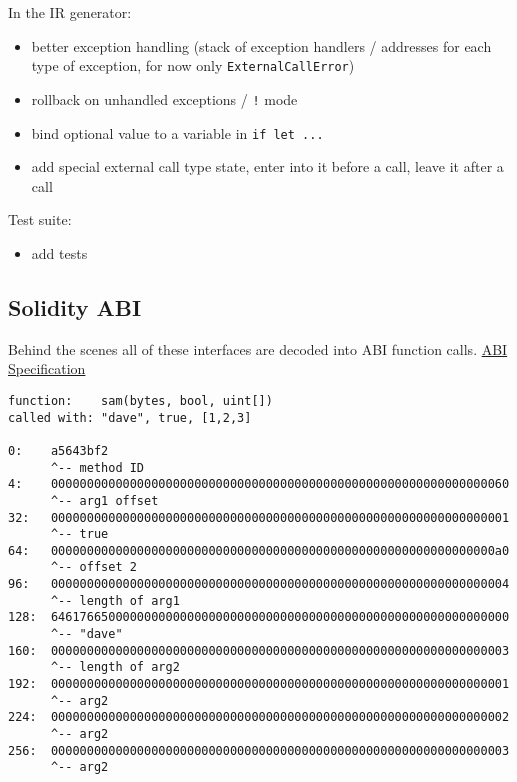 In the IR generator:

\begin{itemize}
	\item better exception handling (stack of exception handlers / addresses for each type of exception, for now only \texttt{ExternalCallError})
	\item rollback on unhandled exceptions / \texttt{!} mode
	\item bind optional value to a variable in \texttt{if let ...}
	\item add special external call type state, enter into it before a call, leave it after a call
\end{itemize}

Test suite:

\begin{itemize}
	\item add tests
\end{itemize}

\subsection{Solidity ABI}

Behind the scenes all of these interfaces are decoded into ABI function calls. \href{https://solidity.readthedocs.io/en/v0.4.24/abi-spec.html}{ABI Specification}

\begin{verbatim}
function:    sam(bytes, bool, uint[])
called with: "dave", true, [1,2,3]

0:    a5643bf2                                                        
      ^-- method ID
4:    0000000000000000000000000000000000000000000000000000000000000060
      ^-- arg1 offset
32:   0000000000000000000000000000000000000000000000000000000000000001
      ^-- true
64:   00000000000000000000000000000000000000000000000000000000000000a0
      ^-- offset 2
96:   0000000000000000000000000000000000000000000000000000000000000004
      ^-- length of arg1
128:  6461766500000000000000000000000000000000000000000000000000000000
      ^-- "dave"
160:  0000000000000000000000000000000000000000000000000000000000000003
      ^-- length of arg2
192:  0000000000000000000000000000000000000000000000000000000000000001
      ^-- arg2
224:  0000000000000000000000000000000000000000000000000000000000000002
      ^-- arg2
256:  0000000000000000000000000000000000000000000000000000000000000003
      ^-- arg2
\end{verbatim}

